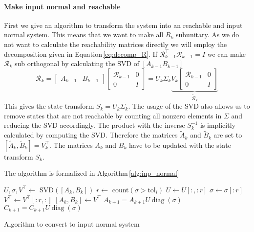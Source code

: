 \documentclass[doctype=mastersthesis,BCOR=15mm,biblatex]{ldvbook}%
\DeclareMathOperator{\diag}{diag}
\newcommand{\R}{\mathcal{R}} %
\newcommand{\eye}{I} %
\begin{document}
\begin{itemize}
\paragraph{Make input normal and reachable}
First we give an algorithm to transform the system into an reachable and input normal system.
This means that we want to make all $R_k$ subunitary.
As we do not want to calculate the reachability matrices directly we will employ the decomposition given in Equation\,\ref{eq:decomp_R}.
If $\R_{k-1}^\top \R_{k-1}=\eye$ we can make $\R_{k}$ sub orthogonal by calculating the SVD of $[A_{k-1} B_{k-1}]$
\begin{equation}
\R_k = 
\begin{bmatrix}
A_{k-1} & B_{k-1}
\end{bmatrix}
\begin{bmatrix}
\R_{k-1} &0\\
0& \eye
\end{bmatrix}
=U_k\Sigma _k
\underbrace{V_k
\begin{bmatrix}
\R_{k-1} &0\\
0& \eye
\end{bmatrix}}_{\tilde{\R}_k}
\end{equation}
This gives the state transform $S_k = U_k\Sigma_k$. 
The usage of the SVD also allows us to remove states that are not reachable by counting all nonzero elements in $\Sigma$ and reducing the SVD accordingly.
The product with the inverse $S_k^{-1}$ is implicitly calculated by computing the SVD.
Therefore the matrices $\tilde{A}_k$ and $\tilde{B}_k$ are set to $[\tilde{A}_k,\tilde{B}_k]=V_k^\top$.
The matrices $A_{k}$ and $B_{k}$ have to be updated with the state transform $S_k$.

The algorithm is formalized in Algorithm\,\ref{alg:inp_normal}

\begin{algorithm}[htb]
	\begin{algorithmic}
		\State $U,\sigma,V^\top \gets$ SVD$([A_k,B_k])$
		\State $r \gets $ count$(\sigma>\text{tol}_i)$
		\State $U \gets U[:,:r]$
		\State $\sigma \gets \sigma[:r]$
		\State $V^\top \gets V^\top[:r,:]$
		\State $[A_k,B_k] \gets V^\top$
		\State $A_{k+1}=A_{k+1}U\diag(\sigma)$
		\State $C_{k+1}=C_{k+1}U\diag(\sigma)$
	\EndFor
	\end{algorithmic}
\caption{Algorithm to convert to input normal system}\label{alg:inp_normal}
\end{algorithm}


\end{itemize}
\end{document}
